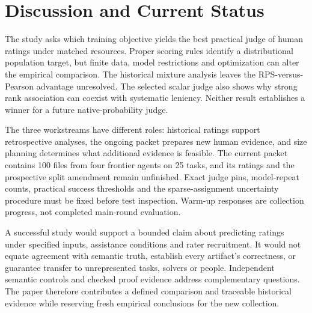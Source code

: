 \section{Discussion and Current Status}
The study asks which training objective yields the best practical judge of human ratings under matched resources.
Proper scoring rules identify a distributional population target, but finite data, model restrictions and optimization can alter the empirical comparison.
The historical mixture analysis leaves the RPS-versus-Pearson advantage unresolved.
The selected scalar judge also shows why strong rank association can coexist with systematic leniency.
Neither result establishes a winner for a future native-probability judge.

The three workstreams have different roles: historical ratings support retrospective analyses, the ongoing packet prepares new human evidence, and size planning determines what additional evidence is feasible.
The current packet contains 100 files from four frontier agents on 25 tasks, and its ratings and the prospective split amendment remain unfinished.
Exact judge pins, model-repeat counts, practical success thresholds and the sparse-assignment uncertainty procedure must be fixed before test inspection.
Warm-up responses are collection progress, not completed main-round evaluation.

A successful study would support a bounded claim about predicting ratings under specified inputs, assistance conditions and rater recruitment.
It would not equate agreement with semantic truth, establish every artifact's correctness, or guarantee transfer to unrepresented tasks, solvers or people.
Independent semantic controls and checked proof evidence address complementary questions.
The paper therefore contributes a defined comparison and traceable historical evidence while reserving fresh empirical conclusions for the new collection.
